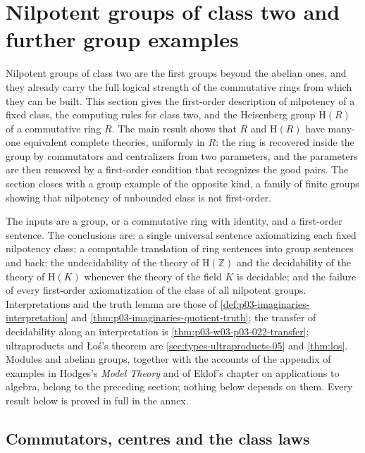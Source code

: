 \section{Nilpotent groups of class two and further group examples}
\label{sec:p03-w03-p03-074-nilpotent}

Nilpotent groups of class two are the first groups beyond the abelian ones,
and they already carry the full logical strength of the commutative rings
from which they can be built. This section gives the first-order
description of nilpotency of a fixed class, the computing rules for class
two, and the Heisenberg group \(\mathrm H(R)\) of a commutative ring
\(R\). The main result shows that \(R\) and \(\mathrm H(R)\) have
many-one equivalent complete theories, uniformly in \(R\): the ring is
recovered inside the group by commutators and centralizers from two
parameters, and the parameters are then removed by a first-order
condition that recognizes the good pairs. The section closes with a group
example of the opposite kind, a family of finite groups showing that
nilpotency of unbounded class is not first-order.

The inputs are a group, or a commutative ring with identity, and a
first-order sentence. The conclusions are: a single universal sentence
axiomatizing each fixed nilpotency class; a computable translation of ring
sentences into group sentences and back; the undecidability of the theory
of \(\mathrm H(\mathbb Z)\) and the decidability of the theory of
\(\mathrm H(K)\) whenever the theory of the field \(K\) is decidable; and
the failure of every first-order axiomatization of the class of all
nilpotent groups. Interpretations and the truth lemma are those of
\cref{def:p03-imaginaries-interpretation} and
\cref{thm:p03-imaginaries-quotient-truth}; the transfer of decidability
along an interpretation is \cref{thm:p03-w03-p03-022-transfer};
ultraproducts and \L o\'s's theorem are \cref{sec:types-ultraproducts-05} and
\cref{thm:los}. Modules and abelian groups, together with the accounts of
the appendix of examples in Hodges's \emph{Model Theory} and of Eklof's
chapter on applications to algebra, belong to the preceding section; nothing
below depends on them. Every result below is proved in full in the annex.

\subsection{Commutators, centres and the class laws}
\label{sec:p03-w03-p03-074-class-laws}

